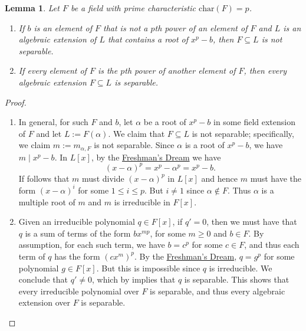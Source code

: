 \documentclass[12pt]{report}
\newtheorem{lemma}[theorem]{Lemma}
\numberwithin{equation}{section}
\numberwithin{theorem}{chapter}
\theoremstyle{definition}
\newtheorem*{basic properties}{Basic Properties}
\newtheorem*{Important Remark}{Important Remark}
\begin{document}
\begin{lemma}\label{separable in char p}
Let $F$ be a field with prime characteristic $\mathrm{char}(F) = p$. 
\begin{enumerate}[label=\alph*),leftmargin=15pt]
\item If $b$ is an element of $F$ that is not a $p$th power of an element of $F$ and $L$ is an algebraic extension of $L$ that contains a root of $x^p - b$, then $F \subseteq L$ is not separable. 
\item If every element of $F$ is the $p$th power of another element of $F$, then every algebraic extension $F \subseteq L$ is separable.
\end{enumerate}
\end{lemma}

\begin{proof}$\,$
\begin{enumerate}[label=\alph*),leftmargin=15pt]
\item In general, for such $F$ and $b$, let $\alpha$ be a root of $x^p - b$ in some field extension of $F$ and let $L := F(\alpha)$. We claim that $F \subseteq L$ is not separable; specifically, we claim $m := m_{\alpha, F}$ is not separable.
Since $\alpha$ is a root of $x^p - b$, we have $m \mid x^p - b$. In $L[x]$,
by the \hyperref[freshmans dream]{Freshman's Dream} we have
$$(x-\alpha)^p = x^p - \alpha^p = x^p -b.$$
If follows that $m$ must divide $(x-\alpha)^p$ in $L[x]$ and hence $m$ must have the form $(x-\alpha)^i$ for some $1 \leqslant i \leqslant p$. But $i \neq 1$ since $\alpha \notin F$.
Thus $\alpha$ is a multiple root of $m$ and $m$ is irreducible in $F[x]$.


\item Given an irreducible polynomial $q \in F[x]$, if $q' = 0$, then we must have that $q$ is a sum of terms of the form $b x^{mp}$, for some $m \geqslant 0$ and $b \in F$.
By assumption, for each such term, we have $b = c^p$ for some $c \in F$, and thus each term of $q$ has the form $(cx^m)^p$.
By the \hyperref[freshmans dream]{Freshman's Dream}, $q = g^p$ for some polynomial $g \in F[x]$. But this is impossible since $q$ is irreducible. We conclude that $q' \neq 0$, which by  implies that $q$ is separable. This shows that every irreducible polynomial over $F$ is separable, and thus every algebraic extension over $F$ is separable. 
\qedhere
\end{enumerate}
\end{proof}
\end{document}
